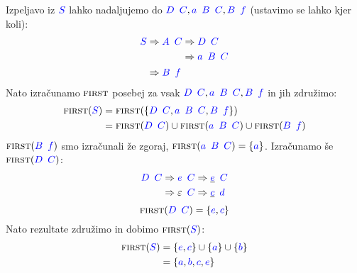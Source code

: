 \documentclass{article}
\newcommand{\FIRST}{\textsc{first}}
\newcommand{\Symbol}[1]{\textcolor{blue}{#1}}
\newcommand{\Null}{\varepsilon}
\newcommand{\Derive}{\Rightarrow}
\newcommand{\Seq}{{\ \,}}
\begin{document}
  Izpeljavo iz $\Symbol{S}$ lahko nadaljujemo do $\Symbol{D} \Seq \Symbol{C}, \Symbol{a} \Seq \Symbol{B} \Seq \Symbol{C}, \Symbol{B} \Seq \Symbol{f}$ (ustavimo se lahko kjer koli):
  \begin{equation*}
    \Symbol{S} \begin{aligned}[t]
      &\Derive \Symbol{A} \Seq \Symbol{C} \begin{aligned}[t]
        &\Derive \Symbol{D} \Seq \Symbol{C}\\
        &\Derive \Symbol{a} \Seq \Symbol{B} \Seq \Symbol{C}
      \end{aligned}\\
      &\Derive \Symbol{B} \Seq \Symbol{f}
    \end{aligned}
  \end{equation*}
  Nato izračunamo $\FIRST$ posebej za vsak $\Symbol{D} \Seq \Symbol{C}, \Symbol{a} \Seq \Symbol{B} \Seq \Symbol{C}, \Symbol{B} \Seq \Symbol{f}$ in jih združimo:
  \begin{align*}
    \FIRST(\Symbol{S}) &= \FIRST(\{\Symbol{D} \Seq \Symbol{C}, \Symbol{a} \Seq \Symbol{B} \Seq \Symbol{C}, \Symbol{B} \Seq \Symbol{f}\}) \\
              &= \FIRST(\Symbol{D} \Seq \Symbol{C}) \cup \FIRST(\Symbol{a} \Seq \Symbol{B} \Seq \Symbol{C}) \cup \FIRST(\Symbol{B} \Seq \Symbol{f})
  \end{align*}
  $\FIRST(\Symbol{B} \Seq \Symbol{f})$ smo izračunali že zgoraj, $\FIRST(\Symbol{a} \Seq \Symbol{B} \Seq \Symbol{C}) = \{\Symbol{a}\}$.
  Izračunamo še $\FIRST(\Symbol{D} \Seq \Symbol{C})$:
  \begin{equation*}
    \Symbol{D} \Seq \Symbol{C} \begin{aligned}[t]
      &\Derive \Symbol{e} \Seq \Symbol{C} \Derive \underline{\Symbol{e}} \Seq \Symbol{C} \\
      &\Derive \Null \Seq \Symbol{C} \Derive \underline{\Symbol{c}} \Seq \Symbol{d} \\
    \end{aligned}
  \end{equation*}
  \begin{equation*}
    \FIRST(\Symbol{D} \Seq \Symbol{C}) = \{\Symbol{e}, \Symbol{c}\}
  \end{equation*}
  Nato rezultate združimo in dobimo $\FIRST(\Symbol{S})$:
  \begin{align*}
    \FIRST(\Symbol{S}) &= \{\Symbol{e}, \Symbol{c}\} \cup \{\Symbol{a}\} \cup \{\Symbol{b}\} \\
              &= \{\Symbol{a}, \Symbol{b}, \Symbol{c}, \Symbol{e}\}
  \end{align*}
\end{document}

